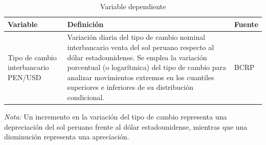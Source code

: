 ﻿\documentclass[11pt,a4paper]{article}
\begin{document}
\begin{table}[H]
\centering
\caption{Variable dependiente}
\label{tab:variable_dependiente}
\footnotesize

\begin{tabular}{p{4cm} p{8cm} p{2.5cm}}
\hline
\textbf{Variable} & \textbf{Definición} & \textbf{Fuente} \\
\hline

Tipo de cambio interbancario PEN/USD 
& Variación diaria del tipo de cambio nominal interbancario venta del sol peruano respecto al dólar estadounidense. Se emplea la variación porcentual (o logarítmica) del tipo de cambio para analizar movimientos extremos en los cuantiles superiores e inferiores de su distribución condicional. 
& BCRP \\

\hline
\end{tabular}

\vspace{0.2cm}

\begin{minipage}{1.0\textwidth}
\footnotesize
\textit{Nota:} Un incremento en la variación del tipo de cambio representa una depreciación del sol peruano frente al dólar estadounidense, mientras que una disminución representa una apreciación. 
\end{minipage}

\end{table}
\end{document}
